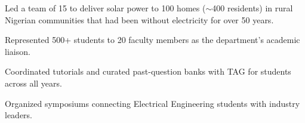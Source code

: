 
\begin{details}
    \item Led a team of 15 to deliver solar power to 100 homes ($\sim$400 residents) in rural Nigerian communities that had been without electricity for over 50 years.
\end{details}

\begin{details}
    \item Represented 500+ students to 20 faculty members as the department's academic liaison.
    \item Coordinated tutorials and curated past-question banks with TAG for students across all years.
    \item Organized symposiums connecting Electrical Engineering students with industry leaders.
\end{details}
